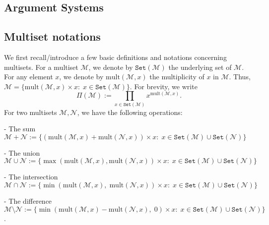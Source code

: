 \documentclass[11pt, lettersize, notitlepage, leqno, footskip=0.6cm]{article}
\newcommand{\pl}{\prod\limits}
\newcommand{\ttt}{\texttt}
\newcommand{\sett}{\ttt{Set}}
\newcommand{\mult}{\mr{mult}}
\newcommand{\mul}{\mr{mult}}
\newcommand{\mc}{\mathcal}
\newcommand{\mr}{\mathrm}
\newcommand{\sm}{\setminus}
\newcommand{\vs}{\vspace{-0.15cm}}
\newcommand{\noin}{\noindent}
\newtheorem{Def}{Definition}[section]
\numberwithin{equation}{section}
\begin{document}
\subsection{\fontsize{11}{11}\selectfont Argument Systems }
\begin{comment}

\begin{Def} \normalfont We say an argument system $\protect{(\verb|Pgen,;P,V|)}$ is \textit{sound} if for all PPT adversaries $\mc{A} = (\mc{A}_0, \mc{A}_1)$, the probability of $\mc{A}$ forging a fake proof is negligible.\end{Def}

\begin{Def} \normalfont An argument system is \textit{non-interactive} if it consists of a single round of interaction between the Prover and the Verifier.\end{Def}

\noin \textbf{This subsection needs to be completed}


\end{comment}


\subsection{\fontsize{11}{11}\selectfont Multiset notations}


We first recall/introduce a few basic definitions and notations concerning multisets. For a multiset $\mc{M}$, we denote by $\sett(\mc{M})$ the underlying set of $\mc{M}$. For any element $x$, we denote by $\mul(\mc{M},x)$ the multiplicity of $x$ in $\mc{M}$. Thus, $\mc{M} = \{ \mult(\mc{M},x)\times x: \; x\in \sett(\mc{M})\}$. For brevity, we write \vs $$\Pi(\mc{M}):= \pl_{x\in \sett(\mc{M})} x^{\mult(\mc{M},x)}.$$ For two multisets $\mc{M}, \mc{N}$, we have the following operations:\vspace{0.1cm}

\noin - The sum $\mc{M}+\mc{N} := \{(\mul(\mc{M},x)+\mul(\mc{N},x))\times x:\;x\in \sett(\mc{M})\cup\sett(\mc{N}) \}$

\noin - The union $\mc{M}\cup \mc{N} := \{\max(\mul(\mc{M},x),\mul(\mc{N},x))\times x:\;x\in \sett(\mc{M})\cup\sett(\mc{N})\}$

\noin - The intersection $\mc{M}\cap \mc{N} := \{\min(\mul(\mc{M},x),\;\mul(\mc{N},x))\times x:\;x\in \sett(\mc{M})\cup\sett(\mc{N})\}$

\noin - The difference $\mc{M}\sm \mc{N} := \{\min(\mul(\mc{M},x)-\mul(\mc{N},x),\; 0)\times x:\;x\in \sett(\mc{M})\cup\sett(\mc{N})\}$.\vspace{0.1cm}
\end{document}
